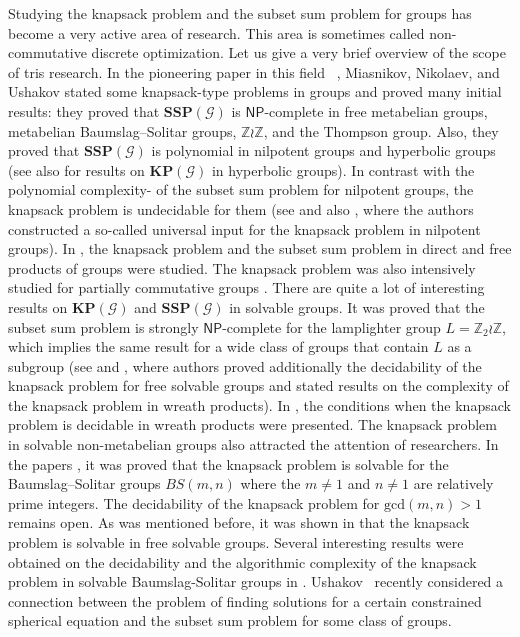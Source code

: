 \documentclass[reqno,12pt]{amsart}
\theoremstyle{definition}
\newcommand{\tKP}{\mathbf{KP}}
\newcommand{\tSSP}{\mathbf{SSP}}
\newcommand{\NP}{\mathsf{NP}}
\begin{document}
Studying the knapsack problem and the subset sum problem for groups has become a very active area of research.
This area is sometimes called non-commutative discrete optimization. Let us give a very brief overview of the scope of tris research.
In the pioneering paper in this field ~\cite{MiasnikovNikolaevUshakov2015}, Miasnikov, Nikolaev, and Ushakov stated some knapsack-type problems in groups and proved many initial results: they proved that $\tSSP(\mathcal{G})$ is $\NP$-complete in free metabelian groups, metabelian Baumslag--Solitar groups, $\mathbb{Z} \wr \mathbb{Z}$, and the Thompson group.
Also, they proved that $\tSSP(\mathcal{G})$ is polynomial in nilpotent groups and hyperbolic groups (see also \cite{Lohrey2020} for results on $\tKP(\mathcal{G})$ in hyperbolic groups).
In contrast with the polynomial complexity- of the subset sum problem for nilpotent groups, the knapsack problem is undecidable for them (see \cite{KonigLohreyZetzsche2016, MishchenkoTreier2017} and also \cite{MishchenkoTreier2018KP}, where the authors constructed a so-called universal input for the knapsack problem in nilpotent groups).
In \cite{FrenkelNikolaevUshakov2016}, the knapsack problem and the subset sum problem in direct and free products of groups were studied.
The knapsack problem was also intensively studied for partially commutative groups \cite{LohreyZetzsche2016, LohreyZetzsche2017}.
There are quite a lot of interesting results on $\tKP(\mathcal{G})$ and $\tSSP(\mathcal{G})$ in solvable groups.
It was proved that the subset sum problem is strongly $\NP$-complete for the lamplighter group $L = \mathbb{Z}_2 \wr \mathbb{Z}$, which implies the same result for a wide class of groups that contain $L$ as a subgroup (see \cite{MishchenkoTreier2018SSP} and \cite{GanardiKonigLohreyZetzsche2018}, where authors proved additionally the decidability of the knapsack problem for free solvable groups and stated results on the complexity of the knapsack problem in wreath products).
In \cite{BergstrasserGanardiZetzsche2021}, the conditions when the knapsack problem is decidable in wreath products were presented.
The knapsack problem in solvable non-metabelian groups also attracted the attention of researchers. In the papers \cite{DudkinTreier2018, DudkinTreier2018RUS}, it was proved that the knapsack problem is solvable for the Baumslag--Solitar groups $BS(m, n)$ where the $m \neq 1$ and $n \neq 1$ are relatively prime integers.
The decidability of the knapsack problem for $\mathrm{gcd}(m,n) > 1$ remains open.
As was mentioned before, it was shown in \cite{GanardiKonigLohreyZetzsche2018} that the knapsack problem is solvable in free solvable groups.
Several interesting results were obtained on the decidability and the algorithmic complexity of the knapsack problem in solvable Baumslag-Solitar groups in \cite{GanardiLohreyZetzsche2023}.
Ushakov~\cite{Ushakov2024} recently considered a connection between the problem of finding solutions for a certain constrained spherical equation and the subset sum problem for some class of groups.
\end{document}
